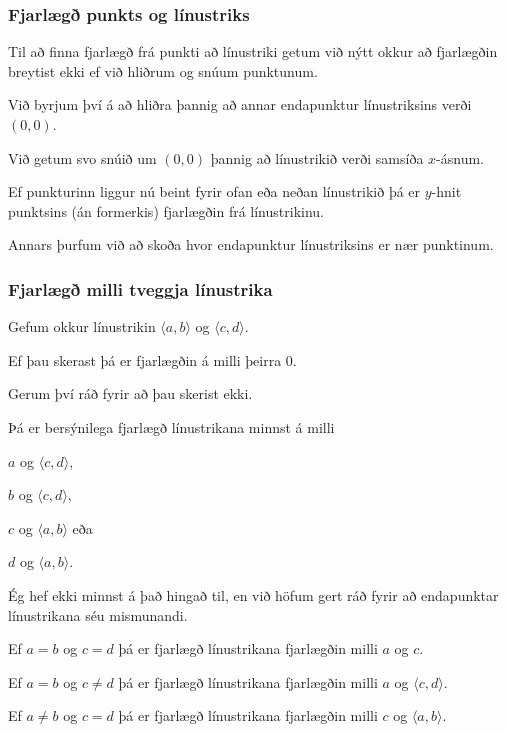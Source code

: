 {
}

{
	\frametitle{Fjarlægð punkts og línustriks}
	{
		\item<1-> Til að finna fjarlægð frá punkti að línustriki getum við nýtt okkur að fjarlægðin breytist ekki ef við hliðrum og snúum punktunum.
		\item<2-> Við byrjum því á að hliðra þannig að annar endapunktur línustriksins verði $(0, 0)$.
		\item<3-> Við getum svo snúið um $(0, 0)$ þannig að línustrikið verði samsíða $x$-ásnum.
		\item<4-> Ef punkturinn liggur nú beint fyrir ofan eða neðan línustrikið þá er $y$-hnit punktsins (án formerkis) fjarlægðin frá línustrikinu.
		\item<5-> Annars þurfum við að skoða hvor endapunktur línustriksins er nær punktinum.
	}
}

{
}

{
	\frametitle{Fjarlægð milli tveggja línustrika}
	{
		\item<1-> Gefum okkur línustrikin $\langle a, b \rangle$ og $\langle c, d \rangle$.
		\item<2-> Ef þau skerast þá er fjarlægðin á milli þeirra $0$.
		\item<3-> Gerum því ráð fyrir að þau skerist ekki.
		\item<4-> Þá er bersýnilega fjarlægð línustrikana minnst á milli 
		{
			\item<5-> $a$ og $\langle c, d \rangle$, 
			\item<6-> $b$ og $\langle c, d \rangle$, 
			\item<7-> $c$ og $\langle a, b \rangle$ eða 
			\item<8-> $d$ og $\langle a, b \rangle$.
		}
	}
}

{
	{
		\item<1-> Ég hef ekki minnst á það hingað til, en við höfum gert ráð fyrir að endapunktar 
			línustrikana séu mismunandi.
		\item<2-> Ef $a = b$ og $c = d$ þá er fjarlægð línustrikana fjarlægðin milli $a$ og $c$.
		\item<3-> Ef $a = b$ og $c \neq d$ þá er fjarlægð línustrikana fjarlægðin milli $a$ og $\langle c, d \rangle$.
		\item<4-> Ef $a \neq b$ og $c = d$ þá er fjarlægð línustrikana fjarlægðin milli $c$ og $\langle a, b \rangle$.
	}
}

